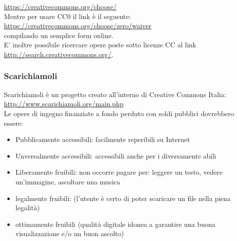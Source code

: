 \url{https://creativecommons.org/choose/}\\

Mentre per usare CC0 il link è il seguente: \\

\url{https://creativecommons.org/choose/zero/waiver}\\

compilando un semplice form online.\\

E' inoltre possibile ricercare opere poste sotto licenze CC al link \\

\url{http://search.creativecommons.org/}.\\

\subsubsection{Scarichiamoli}

Scarichiamoli è un progetto creato all'interno di Creative Commons
Italia: \\

\url{http://www.scarichiamoli.org/main.php} \\

Le opere di ingegno finanziate a fondo perduto con soldi pubblici dovrebbero essere:

\begin{itemize}
\item Pubblicamente accessibili: facilmente reperibili su Internet
\item Unversalmente accessibili: accessibili anche per i diversamente abili
\item Liberamente fruibili: non occorre pagare per: leggere un testo, vedere un'immagine, ascoltare una musica
\item legalmente fruibili: (l'utente è certo di poter scaricare un file nella piena legalità)
\item ottimamente fruibili (qualità digitale idonea a garantire una buona visualizzazione e/o un buon ascolto)
\end{itemize}